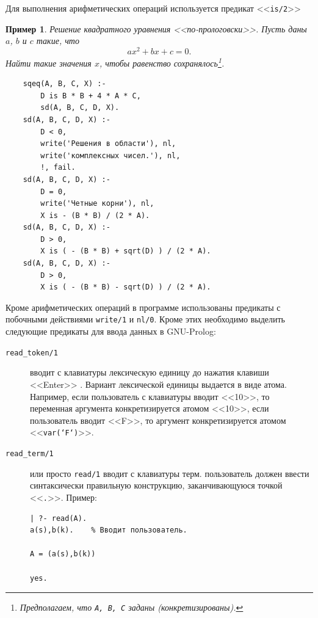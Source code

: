 \documentclass[12pt, openany, twoside]{book} %
\newtheorem{example}{Пример}[chapter]
\begin{document}
Для выполнения арифметических операций используется предикат <<{\tt is/2}>>
\begin{example}
Решение квадратного уравнения <<по-прологовски>>. Пусть даны $a$, $b$ и $c$ такие, что
$$
    ax^2+bx+c=0.
$$
Найти такие значения $x$, чтобы равенство сохранялось\footnote{Предполагаем, что {\tt A, B, C} заданы (конкретизированы).}.
\end{example}
{\tt\begin{verbatim}
    sqeq(A, B, C, X) :-
        D is B * B + 4 * A * C,
        sd(A, B, C, D, X).
    sd(A, B, C, D, X) :-
        D < 0,
        write('Решения в области'), nl,
        write('комплексных чисел.'), nl,
        !, fail.
    sd(A, B, C, D, X) :-
        D = 0,
        write('Четные корни'), nl,
        X is - (B * B) / (2 * A).
    sd(A, B, C, D, X) :-
        D > 0,
        X is ( - (B * B) + sqrt(D) ) / (2 * A).
    sd(A, B, C, D, X) :-
        D > 0,
        X is ( - (B * B) - sqrt(D) ) / (2 * A).
\end{verbatim}}

Кроме арифметических операций в программе использованы предикаты с побочными действиями {\tt write/1} и {\tt nl/0}. Кроме этих необходимо выделить следующие предикаты для ввода данных в GNU-Prolog:
\begin{description}
\item[\tt read\_token/1] вводит с клавиатуры лексическую единицу до нажатия клавиши <<Enter>> . Вариант лексической единицы выдается в виде атома. Например, если пользователь с клавиатуры вводит <<10>>, то переменная аргумента конкретизируется атомом <<10>>, если пользователь вводит <<F>>, то аргумент конкретизируется атомом <<\texttt{var(`F`)}>>.
\item[\tt read\_term/1] или просто \texttt{read/1} вводит с клавиатуры терм. пользователь должен ввести синтаксически правильную конструкцию, заканчивающуюся точкой <<\texttt{.}>>. Пример:
{\tt\begin{verbatim}
| ?- read(A).
a(s),b(k).    % Вводит пользователь.

A = (a(s),b(k))

yes.
\end{verbatim}}
\end{description}
\end{document}
